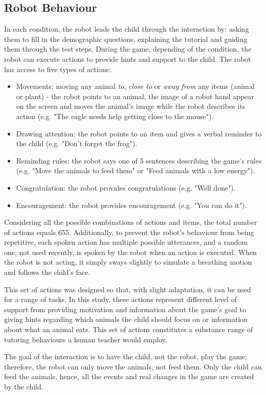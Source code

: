 \subsection{Robot Behaviour} \label{sec:tuto_robot}
In each condition, the robot leads the child through the interaction by: asking them to fill in the demographic questions, explaining the tutorial and guiding them through the test steps. During the game, depending of the condition, the robot can execute actions to provide hints and support to the child. The robot has access to five types of actions:
\begin{itemize}
	\item Movements: moving any animal \emph{to}, \emph{close to} or \emph{away from} any items (animal or plant) - the robot points to an animal, the image of a robot hand appear on the screen and moves the animal's image while the robot describes its action (e.g. "The eagle needs help getting close to the mouse").
	\item Drawing attention: the robot points to an item and gives a verbal reminder to the child (e.g. "Don't forget the frog").
	\item Reminding rules: the robot says one of 5 sentences describing the game's rules (e.g. "Move the animals to feed them" or "Feed animals with a low energy").
	\item Congratulation: the robot provides congratulations (e.g. "Well done").
	\item Encouragement: the robot provides encouragement (e.g. "You can do it").
\end{itemize}
Considering all the possible combinations of actions and items, the total number of actions equals 655. Additionally, to prevent the robot's behaviour from being repetitive, each spoken action has multiple possible utterances, and a random one, not used recently, is spoken by the robot when an action is executed. When the robot is not acting, it simply sways slightly to simulate a breathing motion and follows the child's face. 

This set of actions was designed so that, with slight adaptation, it can be used for a range of tasks. In this study, these actions represent different level of support from providing motivation and information about the game's goal to giving hints regarding which animals the child should focus on or information about what an animal eats. This set of actions constitutes a substance range of tutoring behaviours a human teacher would employ.

The goal of the interaction is to have the child, not the robot, play the game; therefore, the robot can only move the animals, not feed them. Only the child can feed the animals, hence, all the events and real changes in the game are created by the child. 

